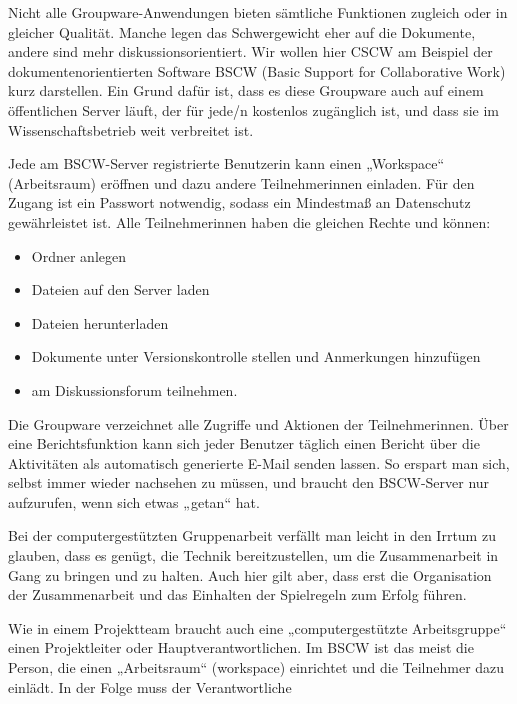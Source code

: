 \documentclass[]{book}
\providecommand{\tightlist}{%
  \setlength{\itemsep}{0pt}\setlength{\parskip}{0pt}}
\theoremstyle{definition}
\theoremstyle{definition}
\theoremstyle{definition}
\theoremstyle{remark}
\begin{document}
Nicht alle Groupware-Anwendungen bieten sämtliche Funktionen zugleich
oder in gleicher Qualität. Manche legen das Schwergewicht eher auf die
Dokumente, andere sind mehr diskussionsorientiert. Wir wollen hier CSCW
am Beispiel der dokumentenorientierten Software BSCW (Basic Support for
Collaborative Work) kurz darstellen. Ein Grund dafür ist, dass es diese
Groupware auch auf einem öffentlichen Server läuft, der für jede/n
kostenlos zugänglich ist, und dass sie im Wissenschaftsbetrieb weit
verbreitet ist.

Jede am BSCW-Server registrierte Benutzerin kann einen „Workspace``
(Arbeitsraum) eröffnen und dazu andere Teilnehmerinnen einladen. Für den
Zugang ist ein Passwort notwendig, sodass ein Mindestmaß an Datenschutz
gewährleistet ist. Alle Teilnehmerinnen haben die gleichen Rechte und
können:

\begin{itemize}
\tightlist
\item
  Ordner anlegen
\item
  Dateien auf den Server laden
\item
  Dateien herunterladen
\item
  Dokumente unter Versionskontrolle stellen und Anmerkungen hinzufügen
\item
  am Diskussionsforum teilnehmen.
\end{itemize}

Die Groupware verzeichnet alle Zugriffe und Aktionen der
Teilnehmerinnen. Über eine Berichtsfunktion kann sich jeder Benutzer
täglich einen Bericht über die Aktivitäten als automatisch generierte
E-Mail senden lassen. So erspart man sich, selbst immer wieder nachsehen
zu müssen, und braucht den BSCW-Server nur aufzurufen, wenn sich etwas
„getan`` hat.

Bei der computergestützten Gruppenarbeit verfällt man leicht in den
Irrtum zu glauben, dass es genügt, die Technik bereitzustellen, um die
Zusammenarbeit in Gang zu bringen und zu halten. Auch hier gilt aber,
dass erst die Organisation der Zusammenarbeit und das Einhalten der
Spielregeln zum Erfolg führen.

Wie in einem Projektteam braucht auch eine „computergestützte
Arbeitsgruppe`` einen Projektleiter oder Hauptverantwortlichen. Im BSCW
ist das meist die Person, die einen „Arbeitsraum`` (workspace)
einrichtet und die Teilnehmer dazu einlädt. In der Folge muss der
Verantwortliche
\end{document}
